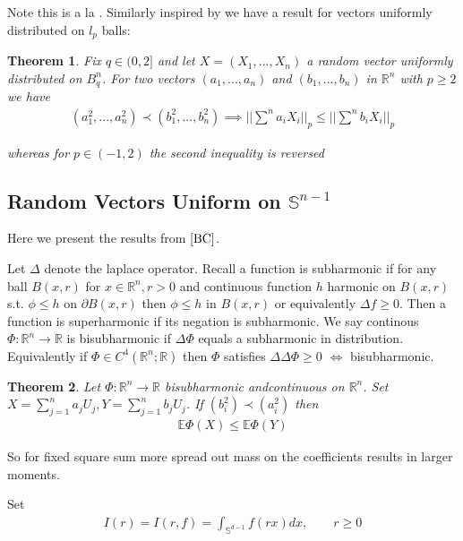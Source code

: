 \documentclass[10pt]{article}
\newcommand{\E}{\mathbb{E}}
\newcommand{\1}{\textbf{1}}
\newcommand{\R}{\mathbb{R}}
\newtheorem{theorem}{Theorem}
\theoremstyle{remark}
\theoremstyle{definition}
\begin{document}
Note this is a la \cite{LO}. Similarly inspired by \cite{BGMN} we have a result for vectors uniformly distributed on $l_p$ balls:

\begin{theorem}
	Fix $q \in (0,2]$ and let $X = (X_1,...,X_n)$ a random vector uniformly distributed on $B_q^n$. For two vectors $(a_1,...,a_n)$ and $(b_1,...,b_n)$ in $\R^n$ with $p \geq 2$ we have
	\begin{align*}
		(a_1^2,...,a_n^2) \prec (b_1^2,...,b_n^2) \implies ||\sum^n a_i X_i||_p \leq ||\sum^n b_i X_i||_p
	\end{align*}

	whereas for $p \in (-1,2)$ the second inequality is reversed
\end{theorem}




\subsection{Random Vectors Uniform on $\mathbb{S}^{n-1}$}

Here we present the results from $\cite{BC}$. 

Let $\Delta$ denote the laplace operator. Recall a function is subharmonic if for any ball $B(x,r)$ for $x \in \R^n, r > 0$ and continuous function $h$ harmonic on $B(x,r)$ s.t. $\phi \leq h$ on $\partial B(x,r)$ then $\phi \leq h$ in $B(x,r)$ or equivalently $\Delta f \geq 0$. Then a function is superharmonic if its negation is subharmonic. We say continous $\Phi : \R^n \to \R$ is bisubharmonic if $\Delta \Phi$ equals a subharmonic in distribution. Equivalently if $\Phi \in C^4(\R^n;\R)$ then $\Phi$ satisfies $\Delta \Delta \Phi \geq 0$ $\iff$ bisubharmonic. 

\begin{theorem}
	Let $\Phi : \R^n \to \R$ bisubharmonic andcontinuous on $\R^n$. Set $X = \sum_{j=1}^n a_j U_j, Y = \sum_{j=1}^n b_jU_j$. If $(b_i^2) \prec (a_i^2)$ then 
	\begin{align*}
		\E \Phi(X) \leq \E \Phi(Y)
	\end{align*}
\end{theorem}

So for fixed square sum more spread out mass on the coefficients results in larger moments. 

Set 
\begin{align*}
	I(r) = I(r,f) = \int_{\mathbb{S}^{d-1}} f(rx) dx, \qquad r \geq 0
\end{align*}
\end{document}
